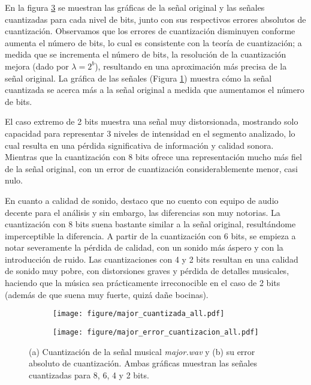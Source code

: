 \documentclass[paper=letter, fontsize=11pt, draft=false]{scrartcl}
\numberwithin{equation}{problemcounter} %
\numberwithin{figure}{problemcounter} %
\numberwithin{table}{problemcounter} %
\numberwithin{subsection}{problemcounter}
\begin{document}
En la figura \ref{fig:major} se muestran las gráficas de la señal original y las señales cuantizadas para cada nivel de bits, junto con sus respectivos errores absolutos de cuantización. Observamos que los errores de cuantización disminuyen conforme aumenta el número de bits, lo cual es consistente con la teoría de cuantización; a medida que se incrementa el número de bits, la resolución de la cuantización mejora (dado por $\lambda = 2^b$), resultando en una aproximación más precisa de la señal original. La gráfica de las señales (Figura \ref{fig:major_a}) muestra cómo la señal cuantizada se acerca más a la señal original a medida que aumentamos el número de bits.

El caso extremo de 2 bits muestra una señal muy distorsionada, mostrando solo capacidad para representar 3 niveles de intensidad en el segmento analizado, lo cual resulta en una pérdida significativa de información y calidad sonora. Mientras que la cuantización con 8 bits ofrece una representación mucho más fiel de la señal original, con un error de cuantización considerablemente menor, casi nulo.

En cuanto a calidad de sonido, destaco que no cuento con equipo de audio decente para el análisis y sin embargo, las diferencias son muy notorias. La cuantización con 8 bits suena bastante similar a la señal original, resultándome imperceptible la diferencia. A partir de la cuantización con 6 bits, se empieza a notar severamente la pérdida de calidad, con un sonido más áspero y con la introducción de ruido. Las cuantizaciones con 4 y 2 bits resultan en una calidad de sonido muy pobre, con distorsiones graves y pérdida de detalles musicales, haciendo que la música sea prácticamente irreconocible en el caso de 2 bits (además de que suena muy fuerte, quizá dañe bocinas).


\begin{figure}
    \centering
    \begin{subfigure}[b]{\linewidth}
        \centering
        \texttt{[image: figure/major\_cuantizada\_all.pdf]}
        \caption{}
        \label{fig:major_a}
    \end{subfigure}
    \vspace{0.5cm}
    \begin{subfigure}[b]{\linewidth}
        \centering
        \texttt{[image: figure/major\_error\_cuantizacion\_all.pdf]}
        \caption{}
        \label{fig:major_b}
    \end{subfigure}
    \caption{(a) Cuantización de la señal musical \textit{major.wav} y (b) su error absoluto de cuantización. Ambas gráficas muestran las señales cuantizadas para 8, 6, 4 y 2 bits.}
    \label{fig:major}
\end{figure}
\end{document}

